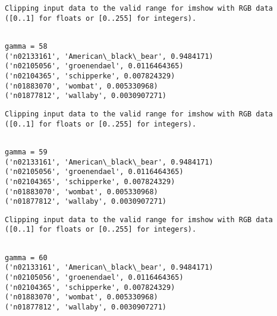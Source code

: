 \documentclass[11pt]{article}
\begin{document}
    \begin{Verbatim}[commandchars=\\\{\}]
Clipping input data to the valid range for imshow with RGB data ([0..1] for floats or [0..255] for integers).

    \end{Verbatim}

    \begin{Verbatim}[commandchars=\\\{\}]

gamma = 58
('n02133161', 'American\_black\_bear', 0.9484171)
('n02105056', 'groenendael', 0.0116464365)
('n02104365', 'schipperke', 0.007824329)
('n01883070', 'wombat', 0.005330968)
('n01877812', 'wallaby', 0.0030907271)

    \end{Verbatim}

    \begin{Verbatim}[commandchars=\\\{\}]
Clipping input data to the valid range for imshow with RGB data ([0..1] for floats or [0..255] for integers).

    \end{Verbatim}

    \begin{Verbatim}[commandchars=\\\{\}]

gamma = 59
('n02133161', 'American\_black\_bear', 0.9484171)
('n02105056', 'groenendael', 0.0116464365)
('n02104365', 'schipperke', 0.007824329)
('n01883070', 'wombat', 0.005330968)
('n01877812', 'wallaby', 0.0030907271)

    \end{Verbatim}

    \begin{Verbatim}[commandchars=\\\{\}]
Clipping input data to the valid range for imshow with RGB data ([0..1] for floats or [0..255] for integers).

    \end{Verbatim}

    \begin{Verbatim}[commandchars=\\\{\}]

gamma = 60
('n02133161', 'American\_black\_bear', 0.9484171)
('n02105056', 'groenendael', 0.0116464365)
('n02104365', 'schipperke', 0.007824329)
('n01883070', 'wombat', 0.005330968)
('n01877812', 'wallaby', 0.0030907271)

    \end{Verbatim}
\end{document}
